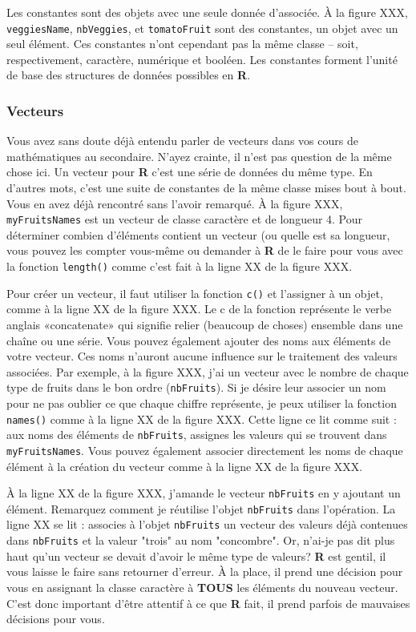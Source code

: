 \documentclass[10.5pt,a4paper]{article}
\begin{document}
    Les constantes sont des objets avec une seule donnée d'associée. À la figure XXX, \texttt{veggiesName}, \texttt{nbVeggies}, et \texttt{tomatoFruit} sont des constantes, un objet avec un seul élément. Ces constantes n'ont cependant pas la même classe -- soit, respectivement, caractère, numérique et booléen. Les constantes forment l'unité de base des structures de données possibles en \textbf{R}. 
    
    \subsubsection{Vecteurs}
    Vous avez sans doute déjà entendu parler de vecteurs dans vos cours de mathématiques au secondaire. N'ayez crainte, il n'est pas question de la même chose ici. Un vecteur pour \textbf{R} c'est une série de données du même type. En d'autres mots, c'est une suite de constantes de la même classe mises bout à bout. Vous en avez déjà rencontré sans l'avoir remarqué. À la figure XXX, \texttt{myFruitsNames} est un vecteur de classe caractère et de longueur 4. Pour déterminer combien d'éléments contient un vecteur (ou quelle est sa longueur, vous pouvez les compter vous-même ou demander à \textbf{R} de le faire pour vous avec la fonction \texttt{length()} comme c'est fait à la ligne XX de la figure XXX. 
    
    Pour créer un vecteur, il faut utiliser la fonction \texttt{c()} et l'assigner à un objet, comme à la ligne XX de la figure XXX. Le c de la fonction représente le verbe anglais «concatenate» qui signifie relier (beaucoup de choses) ensemble dans une chaîne ou une série. Vous pouvez également ajouter des noms aux éléments de votre vecteur. Ces noms n'auront aucune influence sur le traitement des valeurs associées. Par exemple, à la figure XXX, j'ai un vecteur avec le nombre de chaque type de fruits dans le bon ordre (\texttt{nbFruits}). Si je désire leur associer un nom pour ne pas oublier ce que chaque chiffre représente, je peux utiliser la fonction \texttt{names()} comme à la ligne XX de la figure XXX. Cette ligne ce lit comme suit : aux noms des éléments de \texttt{nbFruits}, assignes les valeurs qui se trouvent dans \texttt{myFruitsNames}. Vous pouvez également associer directement les noms de chaque élément à la création du vecteur comme à la ligne XX de la figure XXX. 
    
    À la ligne XX de la figure XXX, j'amande le vecteur \texttt{nbFruits} en y ajoutant un élément. Remarquez comment je réutilise l'objet \texttt{nbFruits} dans l'opération. La ligne XX se lit : associes à l'objet \texttt{nbFruits} un vecteur des valeurs déjà contenues dans \texttt{nbFruits} et la valeur "trois" au nom "concombre". Or, n'ai-je pas dit plus haut qu'un vecteur se devait d'avoir le même type de valeurs? \textbf{R} est gentil, il vous laisse le faire sans retourner d'erreur. À la place, il prend une décision pour vous en assignant la classe caractère à \textbf{TOUS} les éléments du nouveau vecteur. C'est donc important d'être attentif à ce que \textbf{R} fait, il prend parfois de mauvaises décisions pour vous. 
    
\end{document}
